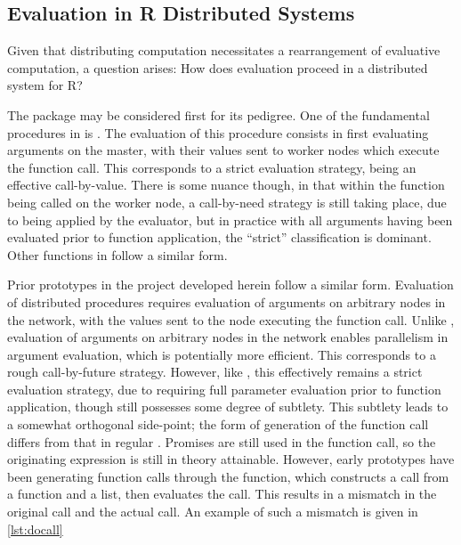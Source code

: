 \subsection{Evaluation in R Distributed Systems}\label{sec:rdisteval}

Given that distributing computation necessitates a rearrangement of evaluative computation, a question arises: How does evaluation proceed in a distributed system for R?

The  package may be considered first for its pedigree.
One of the fundamental procedures in  is \cite{tierney2018snow}.
The evaluation of this procedure consists in first evaluating arguments on the master, with their values sent to worker nodes which execute the function call.
This corresponds to a strict evaluation strategy, being an effective call-by-value.
There is some nuance though, in that within the function being called on the worker node, a call-by-need strategy is still taking place, due to being applied by the \R{} evaluator, but in practice with all arguments having been evaluated prior to function application, the ``strict'' classification is dominant.
Other functions in  follow a similar form.

Prior prototypes in the \lsr project developed herein follow a similar form.
Evaluation of distributed procedures requires evaluation of arguments on arbitrary nodes in the network, with the values sent to the node executing the function call.
Unlike , evaluation of arguments on arbitrary nodes in the network enables parallelism in argument evaluation, which is potentially more efficient.
This corresponds to a rough call-by-future strategy.
However, like , this effectively remains a strict evaluation strategy, due to requiring full parameter evaluation prior to function application, though still possesses some degree of subtlety.
This subtlety leads to a somewhat orthogonal side-point; the form of generation of the function call differs from that in regular \R{}.
Promises are still used in the function call, so the originating expression is still in theory attainable.
However, early \lsr{} prototypes have been generating function calls through the  function, which constructs a call from a function and a list, then evaluates the call.
This results in a mismatch in the original call and the actual call.
An example of such a mismatch is given in \cref{lst:docall}


